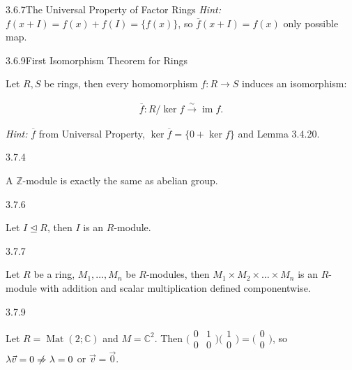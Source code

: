 \documentclass[10pt]{article} %
\DeclareMathOperator{\im}{im}
\DeclareMathOperator{\Mat}{Mat}
\newcommand{\Hint}{\vspace{0.2em}\textit{Hint: }}
\begin{document}
\begin{multicols}{3}
\begin{theorem}{3.6.7}{The Universal Property of Factor Rings}
    \Hint $f(x + I) = f(x) + f(I) = \{f(x)\}$, so $\overline{f}(x + I) = f(x)$ only possible map.%

\end{theorem}

\begin{theorem}{3.6.9}{First Isomorphism Theorem for Rings}

    Let $R,S$ be rings, then every homomorphism $f: R \to S$ induces an isomorphism:

        \begin{align*}
            \overline{f}: R/\ker{f} \xrightarrow{\sim} \im{f}.
        \end{align*}

    \Hint $\overline{f}$ from Universal Property, $\ker{\overline{f}} = \{0 + \ker{f}\}$ and Lemma 3.4.20.

\end{theorem}

\begin{example}{3.7.4}{}

    A $\mathbb{Z}$-module is exactly the same as abelian group.

\end{example}

\begin{example}{3.7.6}{}

    Let $I \unlhd R$, then $I$ is an $R$-module.

\end{example}

\begin{example}{3.7.7}{}

    Let $R$ be a ring, $M_1,\hdots,M_n$ be $R$-modules, then $M_1 \times M_2 \times \hdots \times M_n$ is an $R$-module with addition and scalar multiplication defined componentwise.

\end{example}

\begin{example}{3.7.9}{}

    Let $R = \Mat(2;\mathbb{C})$ and $M = \mathbb{C}^2$. Then $\bigl( \begin{smallmatrix}0 & 1\\ 0 & 0\end{smallmatrix}\bigr) \bigl( \begin{smallmatrix}1 \\ 0\end{smallmatrix}\bigr) = \bigl( \begin{smallmatrix}0 \\ 0\end{smallmatrix}\bigr)$, so $\lambda \vec{v} = 0 \centernot\Rightarrow \lambda = 0$ or $\vec{v} = \vec{0}$.


\end{example}
\end{multicols}
\end{document}
